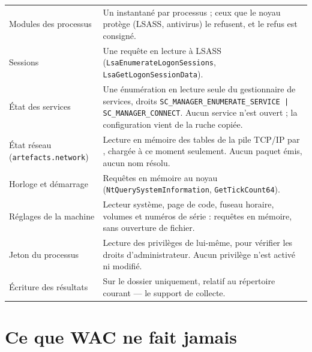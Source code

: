 \documentclass[11pt,a4paper,oneside]{report}
\begin{document}
\begin{longtable}{@{}L{4.3cm}L{10.1cm}@{}}
Modules des processus & Un instantané par processus ; ceux que le noyau
  protège (LSASS, antivirus) le refusent, et le refus est consigné. \\
Sessions & Une requête en lecture à LSASS
  (\texttt{LsaEnumerateLogonSessions}, \texttt{LsaGetLogonSessionData}). \\
État des services & Une énumération en lecture seule du gestionnaire de
  services, droits \texttt{SC\_MANAGER\_ENUMERATE\_SERVICE |
  SC\_MANAGER\_CONNECT}. Aucun service n'est ouvert ; la configuration vient
  de la ruche copiée. \\
État réseau (\texttt{artefacts.network}) & Lecture en mémoire des tables de la
  pile TCP/IP par , chargée à ce moment seulement. Aucun
  paquet émis, aucun nom résolu. \\
Horloge et démarrage & Requêtes en mémoire au noyau
  (\texttt{NtQuerySystemInformation}, \texttt{GetTickCount64}). \\
Réglages de la machine & Lecteur système, page de code, fuseau horaire, volumes
  et numéros de série : requêtes en mémoire, sans ouverture de fichier. \\
Jeton du processus & Lecture des privilèges de \wac{} lui-même, pour vérifier
  les droits d'administrateur. Aucun privilège n'est activé ni modifié. \\
Écriture des résultats & Sur le dossier  uniquement, relatif au
  répertoire courant — le support de collecte. \\
\bottomrule
\end{longtable}


\section{Ce que WAC ne fait jamais}
\end{document}
